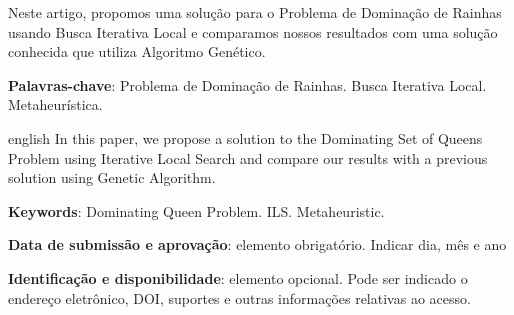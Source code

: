 \documentclass[
	article,			%
	11pt,				%
	oneside,			%
	a4paper,			%
	english,			%
	brazil,				%
	sumario=tradicional
	]{abntex2}
\begin{document}

\frenchspacing 


%
%

\maketitle





\begin{resumoumacoluna}
Neste artigo, propomos uma solução para o Problema de Dominação de Rainhas usando Busca Iterativa Local e comparamos nossos resultados com uma solução conhecida que utiliza Algoritmo Genético.
 
 \vspace{\onelineskip}
 
 \noindent
 \textbf{Palavras-chave}: Problema de Dominação de Rainhas. Busca Iterativa Local. Metaheurística.
\end{resumoumacoluna}


\renewcommand{\resumoname}{Abstract}
\begin{resumoumacoluna}
 \begin{otherlanguage*}{english}
  In this paper, we propose a solution to the Dominating Set of Queens Problem
  using Iterative Local Search and compare our results with a previous 
  solution using Genetic Algorithm.

   \vspace{\onelineskip}
 
   \noindent
   \textbf{Keywords}: Dominating Queen Problem. ILS. Metaheuristic.
 \end{otherlanguage*}  
\end{resumoumacoluna}


\begin{center}\smaller
\textbf{Data de submissão e aprovação}: elemento obrigatório. Indicar dia, mês e ano

\textbf{Identificação e disponibilidade}: elemento opcional. Pode ser indicado 
o endereço eletrônico, DOI, suportes e outras informações relativas ao acesso.
\end{center}
\end{document}
